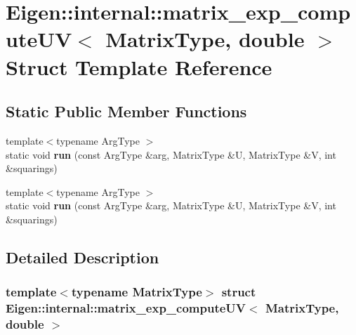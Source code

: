 \hypertarget{struct_eigen_1_1internal_1_1matrix__exp__compute_u_v_3_01_matrix_type_00_01double_01_4}{}\section{Eigen\+:\+:internal\+:\+:matrix\+\_\+exp\+\_\+compute\+UV$<$ Matrix\+Type, double $>$ Struct Template Reference}
\label{struct_eigen_1_1internal_1_1matrix__exp__compute_u_v_3_01_matrix_type_00_01double_01_4}
\subsection*{Static Public Member Functions}
\begin{DoxyCompactItemize}
\item 
\mbox{\label{struct_eigen_1_1internal_1_1matrix__exp__compute_u_v_3_01_matrix_type_00_01double_01_4_a786cb30991e8e5d01f6c2bc6383ce0e9}} 
{\footnotesize template$<$typename Arg\+Type $>$ }\\static void {\bfseries run} (const Arg\+Type \&arg, Matrix\+Type \&U, Matrix\+Type \&V, int \&squarings)
\item 
\mbox{\label{struct_eigen_1_1internal_1_1matrix__exp__compute_u_v_3_01_matrix_type_00_01double_01_4_a786cb30991e8e5d01f6c2bc6383ce0e9}} 
{\footnotesize template$<$typename Arg\+Type $>$ }\\static void {\bfseries run} (const Arg\+Type \&arg, Matrix\+Type \&U, Matrix\+Type \&V, int \&squarings)
\end{DoxyCompactItemize}


\subsection{Detailed Description}
\subsubsection*{template$<$typename Matrix\+Type$>$\newline
struct Eigen\+::internal\+::matrix\+\_\+exp\+\_\+compute\+U\+V$<$ Matrix\+Type, double $>$}



